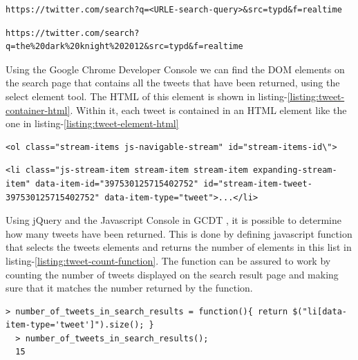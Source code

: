   \begin{lstlisting}[caption={URL of a twitter HTTPS search request for <URLE-search-query>},label={listing:search-request},captionpos=b]
  https://twitter.com/search?q=<URLE-search-query>&src=typd&f=realtime
  \end{lstlisting}

\begin{lstlisting}[caption={URL of a twitter HTTPS search request for "The Dark Knight Rises 2012" parsed to URLE},label={listing:search-request-batman-urle},captionpos=b]
  https://twitter.com/search?q=the%20dark%20knight%202012&src=typd&f=realtime
  \end{lstlisting}

Using the Google Chrome Developer Console \cite{gcdt} we can find the DOM elements on the search page that contains all the tweets that have been returned, using the select element tool. The HTML of this element is shown in listing-\ref{listing:tweet-container-html}. Within it, each tweet is contained in an HTML element like the one in listing-\ref{listing:tweet-element-html}

  \begin{lstlisting}[caption={HTML of the element containing all tweet elements},label={listing:tweet-container-html},captionpos=b]
  <ol class="stream-items js-navigable-stream" id="stream-items-id\">
  \end{lstlisting}

  \begin{lstlisting}[caption={HTML of a tweet element},label={listing:tweet-element-html},captionpos=b]
  <li class="js-stream-item stream-item stream-item expanding-stream-item" data-item-id="397530125715402752" id="stream-item-tweet-397530125715402752" data-item-type="tweet">...</li>
  \end{lstlisting}

Using jQuery \cite{jquery} and the Javascript Console in GCDT \cite{gcdt}, it is possible to determine how many tweets have been returned. This is done by defining javascript function that selects the tweets elements and returns the number of elements in this list in listing-\ref{listing:tweet-count-function}. The function can be assured to work by counting the number of tweets displayed on the search result page and making sure that it matches the number returned by the function.

  \begin{lstlisting}[caption={Creating a function in GCDT Javascript Console for counting the occurance of tweets on the twitter search result page},label={listing:tweet-count-function},captionpos=b]
  > number_of_tweets_in_search_results = function(){ return $("li[data-item-type='tweet']").size(); }
  > number_of_tweets_in_search_results();
  15
  \end{lstlisting}

